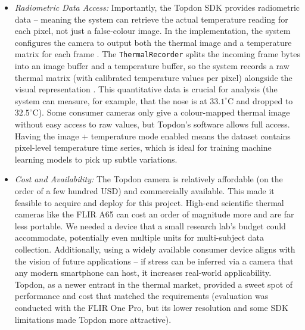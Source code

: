 \documentclass{report}
\begin{document}
\begin{itemize}
	\item \textit{Radiometric Data Access:} Importantly, the Topdon SDK provides radiometric data -- meaning the system can retrieve the actual temperature reading for each pixel, not just a false-colour image. In the implementation, the system configures the camera to output both the thermal image and a temperature matrix for each frame \cite{topdon20}. The \texttt{ThermalRecorder} splits the incoming frame bytes into an image buffer and a temperature buffer, so the system records a raw thermal matrix (with calibrated temperature values per pixel) alongside the visual representation \cite{topdon20}. This quantitative data is crucial for analysis (the system can measure, for example, that the nose is at $33.1^{\circ}$C and dropped to $32.5^{\circ}$C). Some consumer cameras only give a colour-mapped thermal image without easy access to raw values, but Topdon's software allows full access. Having the image + temperature mode enabled \cite{topdon20} means the dataset contains pixel-level temperature time series, which is ideal for training machine learning models to pick up subtle variations.

	\item \textit{Cost and Availability:} The Topdon camera is relatively affordable (on the order of a few hundred USD) and commercially available. This made it feasible to acquire and deploy for this project. High-end scientific thermal cameras like the FLIR A65 can cost an order of magnitude more and are far less portable. We needed a device that a small research lab's budget could accommodate, potentially even multiple units for multi-subject data collection. Additionally, using a widely available consumer device aligns with the vision of future applications -- if stress can be inferred via a camera that any modern smartphone can host, it increases real-world applicability. Topdon, as a newer entrant in the thermal market, provided a sweet spot of performance and cost that matched the requirements (evaluation was conducted with the FLIR One Pro, but its lower resolution and some SDK limitations made Topdon more attractive).


\end{itemize}
\end{document}
